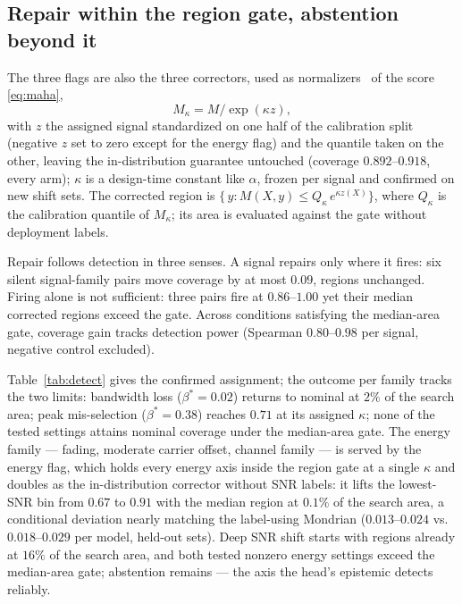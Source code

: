\documentclass{article}
\begin{document}
\subsection{Repair within the region gate, abstention beyond it}
The three flags are also the
three correctors, used as
normalizers~\cite{papadopoulos2002,papadopoulos2008} of the score
\eqref{eq:maha},
\begin{equation}
M_\kappa = M/\exp(\kappa z),
\label{eq:norm}
\end{equation}
with $z$ the assigned signal standardized on one half of the calibration
split (negative $z$ set to zero except for the energy flag) and the
quantile taken on the other, leaving the in-distribution
guarantee untouched (coverage $0.892$--$0.918$, every arm); $\kappa$ is a
design-time constant like $\alpha$, frozen per signal and confirmed on new
shift sets. The corrected region is
$\{\,y : M(X,y)\le Q_\kappa\,e^{\kappa z(X)}\}$, where $Q_\kappa$ is the
calibration quantile of $M_\kappa$; its area is evaluated against the gate
without deployment labels.

Repair follows detection in three senses. A signal repairs only where it
fires: six silent signal-family pairs move coverage by at most $0.09$,
regions unchanged. Firing alone is not sufficient: three pairs fire at
$0.86$--$1.00$ yet their median corrected regions exceed the gate.
Across conditions satisfying the median-area gate, coverage gain tracks
detection power (Spearman $0.80$--$0.98$ per signal, negative control
excluded).

Table~\ref{tab:detect} gives the confirmed assignment; the outcome per family tracks the two limits:
bandwidth loss ($\beta^{*}=0.02$) returns to nominal at $2\%$ of the
search area; peak mis-selection ($\beta^{*}=0.38$) reaches $0.71$ at its assigned
$\kappa$; none of the tested settings attains nominal coverage under the
median-area gate. The energy family --- fading, moderate carrier
offset, channel family --- is served by the energy flag, which holds
every energy axis inside the region gate at a single $\kappa$ and doubles
as the in-distribution corrector without SNR labels: it lifts the
lowest-SNR bin from $0.67$ to $0.91$ with the median region at $0.1\%$ of
the search area, a conditional deviation nearly matching the label-using
Mondrian ($0.013$--$0.024$ vs.\
$0.018$--$0.029$ per model, held-out sets). Deep
SNR shift starts with regions already at $16\%$ of the search area, and both
tested nonzero energy settings exceed the median-area gate; abstention
remains --- the axis the head's epistemic detects reliably.
\end{document}
